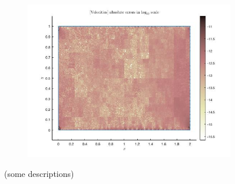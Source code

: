 \begin{figure}[H]
\begin{subfigure}[H]{0.45\textwidth}
    \includegraphics[width=\textwidth]{figures/fig_sample_2.jpg}
  \end{subfigure}
  \caption{
    (some descriptions)
  }
  \label{fig:three-subfigures-example}
\end{figure}

